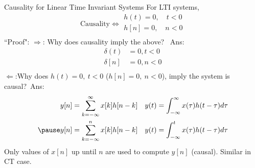 \begin{frame}{Causality for Linear Time Invariant Systems}    For LTI systems,
    \begin{equation*}
        \text{Causality} \Leftrightarrow \begin{split}h(t) = 0, \quad  t <0\\  h[n] = 0, \quad  n <0\\      \end{split}
    \end{equation*}
    ``Proof":
    $\Rightarrow$:  Why does causality imply the above? \pause~Ans:
    {
    \begin{align*}
      \delta(t) &=  0, t<0\\
      \delta[n] &=  0, n<0\\
    \end{align*}
    }
    {
        \vspace{.5in}
    }
    \pause
    $\Leftarrow$:Why does $h(t) = 0, \:  t <0$ ($h[n] = 0, \:  n <0$), imply the system is causal?\pause~Ans:
    {
    \begin{equation*}
        \begin{split}
            y[n] = \sum_{k=-\infty}^{\infty}x[k]h[n-k] \quad & y(t) = \int_{-\infty}^{\infty}x(\tau)h(t-\tau)d\tau\\ \pause
            y[n] = \sum_{k=-\infty}^{n}x[k]h[n-k] \quad & y(t) = \int_{-\infty}^{t}x(\tau)h(t-\tau)d\tau
        \end{split}
    \end{equation*}
    Only values of $x[n]$ up until $n$ are used to compute  $y[n]$ (causal). Similar in CT case.
    }
\end{frame}

